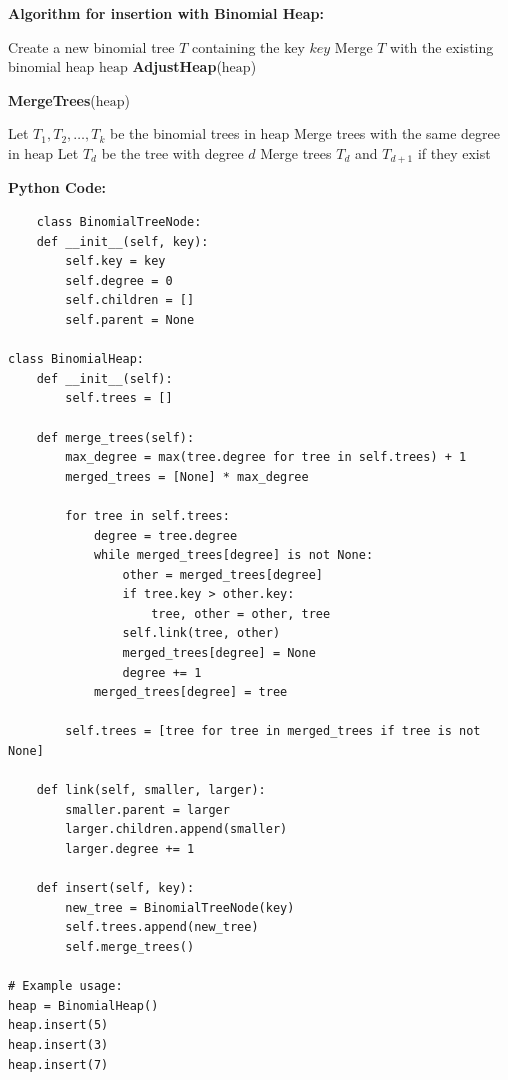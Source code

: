 \documentclass[12pt]{book} %
\begin{document}
\textbf{Algorithm for insertion with Binomial Heap:}
\FloatBarrier
\begin{algorithm}
\caption{Insertion with Binomial Heap}
\begin{algorithmic}[1]
    \State Create a new binomial tree $T$ containing the key $key$
    \State Merge $T$ with the existing binomial heap $\text{heap}$
    \State \textbf{AdjustHeap}($\text{heap}$)
\EndProcedure

    \State \textbf{MergeTrees}($\text{heap}$)
\EndProcedure

    \State Let $T_1, T_2, \ldots, T_k$ be the binomial trees in $\text{heap}$
    \State Merge trees with the same degree in $\text{heap}$
    \State Let $T_d$ be the tree with degree $d$
        \State Merge trees $T_d$ and $T_{d+1}$ if they exist
    \EndFor
\EndProcedure
\end{algorithmic}
\end{algorithm}
\FloatBarrier
\textbf{Python Code:}
\FloatBarrier
\begin{lstlisting}
    class BinomialTreeNode:
    def __init__(self, key):
        self.key = key
        self.degree = 0
        self.children = []
        self.parent = None

class BinomialHeap:
    def __init__(self):
        self.trees = []

    def merge_trees(self):
        max_degree = max(tree.degree for tree in self.trees) + 1
        merged_trees = [None] * max_degree

        for tree in self.trees:
            degree = tree.degree
            while merged_trees[degree] is not None:
                other = merged_trees[degree]
                if tree.key > other.key:
                    tree, other = other, tree
                self.link(tree, other)
                merged_trees[degree] = None
                degree += 1
            merged_trees[degree] = tree

        self.trees = [tree for tree in merged_trees if tree is not None]

    def link(self, smaller, larger):
        smaller.parent = larger
        larger.children.append(smaller)
        larger.degree += 1

    def insert(self, key):
        new_tree = BinomialTreeNode(key)
        self.trees.append(new_tree)
        self.merge_trees()

# Example usage:
heap = BinomialHeap()
heap.insert(5)
heap.insert(3)
heap.insert(7)
\end{lstlisting}
\end{document}
